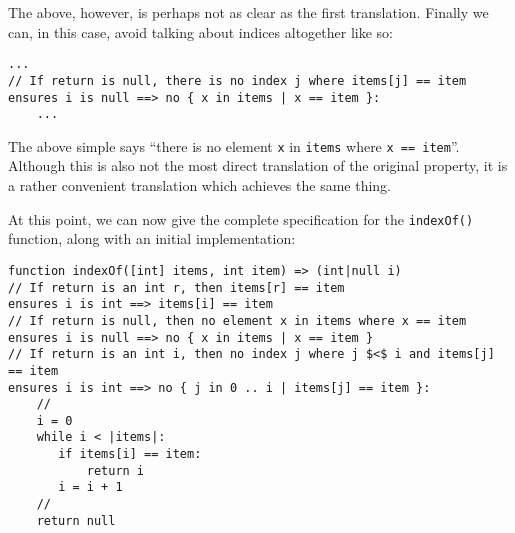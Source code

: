 The above, however, is perhaps not as clear as the first translation.
Finally we can, in this case, avoid talking about indices altogether
like so:

\begin{lstlisting}
...
// If return is null, there is no index j where items[j] == item
ensures i is null ==> no { x in items | x == item }:
    ...
\end{lstlisting}

The above simple says ``there is no element \lstinline{x} in
\lstinline{items} where \lstinline{x == item}''.  Although this is
also not the most direct translation of the original property, it is a
rather convenient translation which achieves the same thing.

At this point, we can now give the complete specification for the
\lstinline{indexOf()} function, along with an initial implementation:

\begin{lstlisting}
function indexOf([int] items, int item) => (int|null i)
// If return is an int r, then items[r] == item
ensures i is int ==> items[i] == item
// If return is null, then no element x in items where x == item
ensures i is null ==> no { x in items | x == item }
// If return is an int i, then no index j where j $<$ i and items[j] == item
ensures i is int ==> no { j in 0 .. i | items[j] == item }:
    //
    i = 0
    while i < |items|:
       if items[i] == item:
           return i 
       i = i + 1
    //
    return null
\end{lstlisting}
